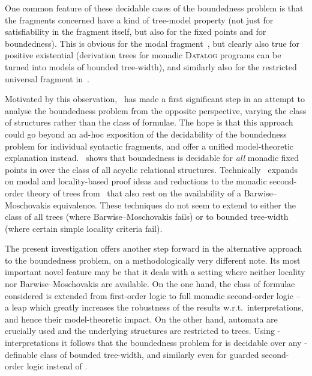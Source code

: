 \documentclass{LMCS}
\begin{document}
One common feature of these decidable cases of the boundedness problem
is that the fragments concerned have a kind of tree-model property
(not just for satisfiability in the fragment itself, but also for the
fixed points and for boundedness).
This is obvious for the modal fragment~\cite{Otto99}, but clearly
also true for positive existential  (derivation trees for monadic
\textsc{Datalog} programs can be turned into models of bounded tree-width),
and similarly also for the restricted universal fragment in~\cite{Otto06}.

Motivated by this observation,
\cite{KOS}~has made a first significant step
in an attempt to analyse the boundedness problem from the opposite perspective,
varying the class of structures rather than the class of formulae. The hope
is that this approach could go beyond an ad-hoc exposition of the
decidability of the boundedness problem for individual syntactic fragments,
and offer a unified model-theoretic explanation instead.
\cite{KOS}~shows that boundedness is decidable for
\emph{all} monadic fixed points in  over the class of all acyclic
relational structures.
Technically \cite{KOS}~expands on modal
and locality-based proof ideas and reductions to
the monadic second-order theory of trees from~\cite{Otto99,Otto06}
that also rest on the availability of a Barwise--Moschovakis
equivalence. These techniques do not seem to extend to either
the class of all trees (where Barwise--Moschovakis fails) or to
bounded tree-width (where certain simple locality criteria fail).

The present investigation offers another step forward in the alternative
approach to the boundedness problem, on a methodologically very
different note. Its most important novel feature may be that it deals 
with a setting where neither locality nor
Barwise--Moschovakis are available. On the one hand, the class of formulae
considered is extended from first-order logic 
to full monadic second-order logic  -- a leap which greatly increases
the robustness of the results w.r.t.\ interpretations, and hence
their model-theoretic impact. On the other hand, automata are crucially used
and the underlying structures are restricted to trees.
Using -interpretations it follows that
the boundedness problem for  is decidable
over any -definable class of bounded tree-width, and similarly
even for guarded second-order logic  instead of .
\end{document}
